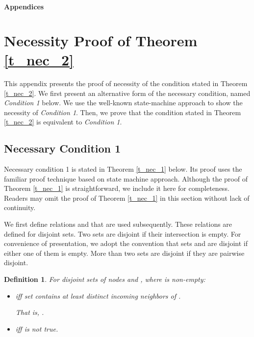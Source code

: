 \documentclass[letterpaper, 11pt]{article}
\newtheorem{definition}{Definition}
\begin{document}
\appendix





\newpage

\centerline{\Large\bf Appendices}














\section{Necessity Proof of Theorem \ref{t_nec_2}}
\label{a_1and2}

This appendix presents the proof of necessity of the condition stated in Theorem \ref{t_nec_2}.
We first present an alternative form of the necessary condition, named {\em Condition 1} below. We use the
well-known state-machine approach \cite{impossible_proof_lynch,dolev_82_BG, welch_book} to show the necessity
of {\em Condition 1}. Then, we prove that the condition stated in Theorem \ref{t_nec_2} is
equivalent to {\em Condition 1}.

\subsection{Necessary Condition 1}

Necessary condition 1 is stated in Theorem \ref{t_nec_1} below.
Its proof uses the familiar proof technique based on state machine approach.
Although the proof of Theorem \ref{t_nec_1} is straightforward, we include it here
for completeness.
Readers may omit the proof of Theorem \ref{t_nec_1} in this section without lack of continuity.

We first define relations  and  that are used subsequently.
These relations are defined for disjoint sets. 
Two sets are disjoint if their intersection is empty.
For convenience of presentation, we adopt the convention that
sets  and  are disjoint if either one of them is empty.
More than two sets are disjoint if they are pairwise disjoint.


\begin{definition}
\label{def:absorb}
For disjoint sets of nodes  and , where  is non-empty:
\begin{itemize}
\item  iff set  contains at least
  distinct incoming neighbors of .

 That is, .
\item  iff  is {\em not} true.
\end{itemize}
\end{definition}
\end{document}
